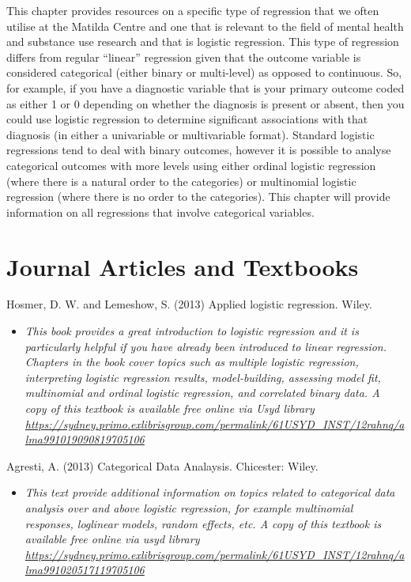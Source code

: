 \documentclass[
]{book}
\providecommand{\tightlist}{%
  \setlength{\itemsep}{0pt}\setlength{\parskip}{0pt}}
\begin{document}
This chapter provides resources on a specific type of regression that we often utilise at the Matilda Centre and one that is relevant to the field of mental health and substance use research and that is logistic regression. This type of regression differs from regular ``linear'' regression given that the outcome variable is considered categorical (either binary or multi-level) as opposed to continuous. So, for example, if you have a diagnostic variable that is your primary outcome coded as either 1 or 0 depending on whether the diagnosis is present or absent, then you could use logistic regression to determine significant associations with that diagnosis (in either a univariable or multivariable format). Standard logistic regressions tend to deal with binary outcomes, however it is possible to analyse categorical outcomes with more levels using either ordinal logistic regression (where there is a natural order to the categories) or multinomial logistic regression (where there is no order to the categories). This chapter will provide information on all regressions that involve categorical variables.

\section{Journal Articles and Textbooks}\label{journal-articles-and-textbooks-6}

Hosmer, D. W. and Lemeshow, S. (2013) Applied logistic regression. Wiley.

\begin{itemize}
\tightlist
\item
  \emph{This book provides a great introduction to logistic regression and it is particularly helpful if you have already been introduced to linear regression. Chapters in the book cover topics such as multiple logistic regression, interpreting logistic regression results, model-building, assessing model fit, multinomial and ordinal logistic regression, and correlated binary data. A copy of this textbook is available free online via Usyd library \url{https://sydney.primo.exlibrisgroup.com/permalink/61USYD_INST/12rahnq/alma991019090819705106} }
\end{itemize}

Agresti, A. (2013) Categorical Data Analaysis. Chicester: Wiley.

\begin{itemize}
\tightlist
\item
  \emph{This text provide additional information on topics related to categorical data analysis over and above logistic regression, for example multinomial responses, loglinear models, random effects, etc. A copy of this textbook is available free online via usyd library \url{https://sydney.primo.exlibrisgroup.com/permalink/61USYD_INST/12rahnq/alma991020517119705106} }
\end{itemize}
\end{document}
